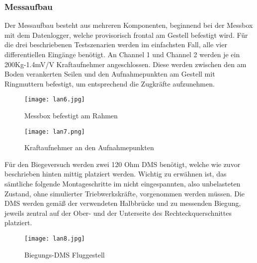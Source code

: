 \subsubsection{Messaufbau}
Der Messaufbau besteht aus mehreren Komponenten, beginnend bei der Messbox mit dem Datenlogger, welche provisorisch frontal am Gestell befestigt wird.
Für die drei beschriebenen Testszenarien werden im einfachsten Fall, alle vier differentiellen Eingänge benötigt.
An Channel 1 und Channel 2 werden je ein 200Kg-1.4mV/V Kraftaufnehmer angeschlossen.
Diese werden zwischen den am Boden verankerten Seilen und den Aufnahmepunkten am Gestell mit Ringmuttern befestigt, um entsprechend die Zugkräfte aufzunehmen. 
\begin{figure}[htbp]
    \centering
    \begin{minipage}{0.48\textwidth}
        \centering
        \texttt{[image: lan6.jpg]}
        \caption[Messbox befestigt am Rahmen (Abbildungsverzeichnis)]{Messbox befestigt am Rahmen}
        
        \label{fig:lan6}
    \end{minipage}
    \hfill
    \begin{minipage}{0.48\textwidth}
        \centering
        \texttt{[image: lan7.png]}
        \caption[Kraftaufnehmer an den Aufnahmepunkten (Abbildungsverzeichnis)]{Kraftaufnehmer an den Aufnahmepunkten}
        
        \label{fig:lan7}
    \end{minipage}
\end{figure}

Für den Biegeversuch werden zwei 120 Ohm DMS benötigt, welche wie zuvor beschrieben hinten mittig platziert werden.
Wichtig zu erwähnen ist, das sämtliche folgende Montageschritte im nicht eingespannten, also unbelasteten Zustand, ohne simulierter Triebwerkskräfte, vorgenommen werden müssen.
Die DMS werden gemäß der verwendeten Halbbrücke und zu messenden Biegung, jeweils zentral auf der Ober- und der Unterseite des Rechteckquerschnittes platziert.

\begin{figure}[htbp]
    \begin{center}
        \texttt{[image: lan8.jpg]}
        \caption[Biegungs-DMS Fluggestell (Abbildungsverzeichnis)]{Biegungs-DMS Fluggestell}
        
        \label{fig:lan8}
    \end{center}
\end{figure}


